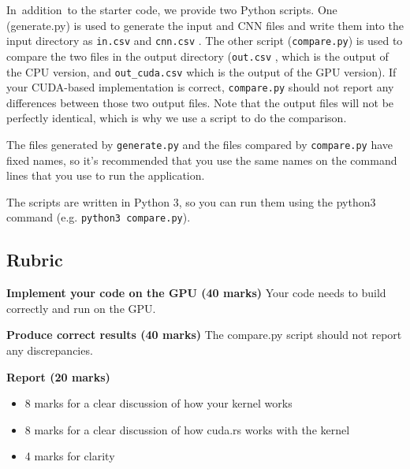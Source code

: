 In\ addition\ to the starter code, we provide two Python scripts. One (generate.py) is  used to generate the input and CNN files and write them into the input directory as \texttt{in.csv}  and \texttt{cnn.csv} .  The other script (\texttt{compare.py}) is used to compare the two files in the output directory (\texttt{out.csv} , which is the output of the CPU version, and \texttt{out\_cuda.csv}  which is the output of the GPU version). If your CUDA-based implementation is correct, \texttt{compare.py} should not report any differences between those two output files. Note that the output files will not be perfectly identical, which is why we use a script to do the comparison.


The files generated by \texttt{generate.py} and the files compared by \texttt{compare.py} have fixed names, so it's recommended that you use the same names on the command lines that you use to run the application.

The scripts are written in Python 3, so you can run them using the python3 command (e.g. \texttt{python3 compare.py}).


\subsection*{Rubric }

\textbf{Implement your code on the GPU (40 marks) }Your code needs to build correctly and run on the GPU.

\textbf{Produce correct results (40 marks)} The compare.py script should not report any discrepancies.

\textbf{Report (20 marks) }


\begin{itemize}
	\item 8 marks for a clear discussion of how your kernel works

	\item 8 marks for a clear discussion of how cuda.rs works with the kernel

	\item 4 marks for clarity
\end{itemize}


